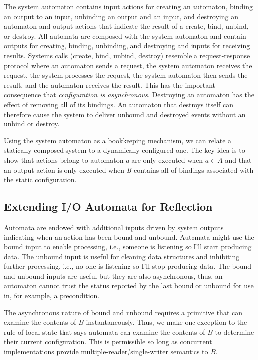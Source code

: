 The system automaton contains input actions for creating an automaton, binding an output to an input, unbinding an output and an input, and destroying an automaton and output actions that indicate the result of a create, bind, unbind, or destroy.
All automata are composed with the system automaton and contain outputs for creating, binding, unbinding, and destroying and inputs for receiving results.
Systems calls (create, bind, unbind, destroy) resemble a request-response protocol where an automaton sends a request, the system automaton receives the request, the system processes the request, the system automaton then sends the result, and the automaton receives the result.
This has the important consequence that \emph{configuration is asynchronous}.
Destroying an automaton has the effect of removing all of its bindings.
An automaton that destroys itself can therefore cause the system to deliver unbound and destroyed events without an unbind or destroy.

Using the system automaton as a bookkeeping mechanism, we can relate a statically composed system to a dynamically configured one.
The key idea is to show that actions belong to automaton $a$ are only executed when $a \in A$ and that an output action is only executed when $B$ contains all of bindings associated with the static configuration.


\subsection{Extending I/O Automata for Reflection}

Automata are endowed with additional inputs driven by system outputs indicating when an action has been bound and unbound.
Automata might use the bound input to enable processing, i.e., someone is listening so I'll start producing data.
The unbound input is useful for cleaning data structures and inhibiting further processing, i.e., no one is listening so I'll stop producing data.
The bound and unbound inputs are useful but they are also asynchronous, thus, an automaton cannot trust the status reported by the last bound or unbound for use in, for example, a precondition.

The asynchronous nature of bound and unbound requires a primitive that can examine the contents of $B$ instantaneously.
Thus, we make one exception to the rule of local state that says automata can examine the contents of $B$ to determine their current configuration.
This is permissible so long as concurrent implementations provide multiple-reader/single-writer semantics to $B$.

